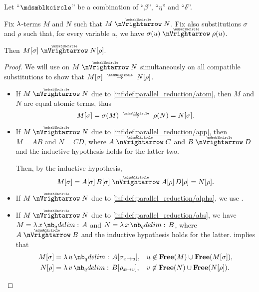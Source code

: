 \begin{proposition}\label{thm:substitution_on_parallel_reduction}
  Let \enquote{\( {\Anon} \)} be a combination of \enquote{\( \beta \)}, \enquote{\( \eta \)} and \enquote{\( \delta \)}.

  Fix \( \mathrm{\lambda} \)-terms \( M \) and \( N \) such that \( M \ppred N \). Fix also substitutions \( \sigma \) and \( \rho \) such that, for every variable \( u \), we have \( \sigma(u) \ppred \rho(u) \).

  Then \( M[\sigma] \ppred N[\rho] \).
\end{proposition}
\begin{proof}
  We will use  on \( M \ppred N \) simultaneously on all compatible substitutions to show that \( M[\sigma] \pred N[\rho] \).
  \begin{itemize}
    \item If \( M \ppred N \) due to \ref{inf:def:parallel_reduction/atom}, then \( M \) and \( N \) are equal atomic terms, thus
    \begin{equation*}
      M[\sigma] = \sigma(M) \pred \rho(N) = N[\sigma].
    \end{equation*}

    \item If \( M \ppred N \) due to \ref{inf:def:parallel_reduction/app}, then \( M = AB \) and \( N = CD \), where \( A \ppred C \) and \( B \ppred D \) and the inductive hypothesis holds for the latter two.

    Then, by the inductive hypothesis,
    \begin{equation*}
      M[\sigma]
      =
      A[\sigma] \thinspace B[\sigma]
      \ppred
      A[\rho] \thinspace D[\rho]
      =
      N[\rho].
    \end{equation*}

    \item If \( M \ppred N \) due to \ref{inf:def:parallel_reduction/alpha}, we use .

    \item If \( M \ppred N \) due to \ref{inf:def:parallel_reduction/abs}, we have \( M = \qabs x A \) and \( N = \qabs x B \), where \( A \ppred B \) and the inductive hypothesis holds for the latter.  implies that
    \begin{align*}
      M[\sigma] &= \qabs u A[\sigma_{x \mapsto u}], &&u \not\in \op*{Free}(M) \cup \op*{Free}(M[\sigma]), \\
      N[\rho]   &= \qabs v B[\rho_{x \mapsto v}],   &&v \not\in \op*{Free}(N) \cup \op*{Free}(N[\rho]).
    \end{align*}


\end{itemize}
\end{proof}
